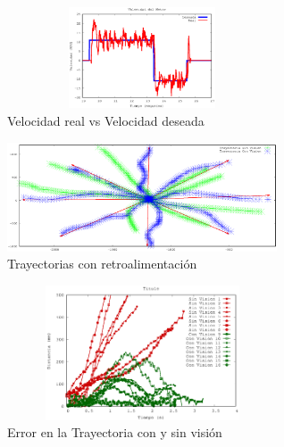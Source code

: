 \documentclass[twocolumn,10pt]{amrob}
\begin{document}
\begin{figure}
  \centering
    \includegraphics[height=3cm,width=8cm]{VelocidadM4.eps}
  \caption{Velocidad real vs Velocidad deseada}
  \label{fig:realVSdes}
\end{figure}
\begin{figure}
  \centering
    \includegraphics[width=8cm]{output1.eps}
  \caption{Trayectorias con retroalimentación}
  \label{fig:visionPruebasRetro}
\end{figure}
\begin{figure}
  \centering
    \includegraphics[height=4cm,width=8cm]{DistErr.eps}
  \caption{Error en la Trayectoria con y sin visión}
  \label{fig:errorPlot}
\end{figure}



\end{document}
